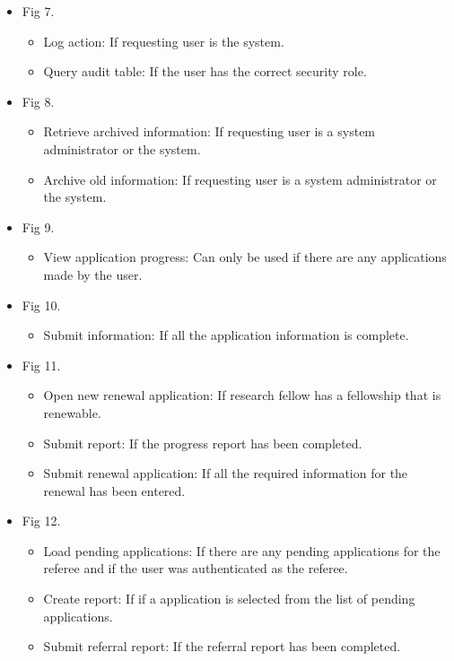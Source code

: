 \documentclass[12pt]{article}
\begin{document}
\begin{itemize}
	\item Fig 7.
		\begin{itemize}
			\item Log action: If requesting user is the system.
			\item Query audit table: If the user has the correct security role.										
		\end{itemize}
	\item Fig 8.
		\begin{itemize}
			\item Retrieve archived information: If requesting user is a system administrator or the system.
			\item Archive old information: If requesting user is a system administrator or the system.						
		\end{itemize}		
	\item Fig 9.
		\begin{itemize}
			\item View application progress: Can only be used if there are any applications made by the user.
		\end{itemize}
		
	\item Fig 10.
		\begin{itemize}
			\item Submit information: If all the application information is complete.
		\end{itemize}
	
	\item Fig 11.
		\begin{itemize}
			\item Open new renewal application: If research fellow has a fellowship that is renewable.
			\item Submit report: If the progress report has been completed.				
			\item Submit renewal application: If all the required information for the renewal has been entered.									
		\end{itemize}
	
	\item Fig 12.
		\begin{itemize}
			\item Load pending applications: If there are any pending applications for the referee and if the user was authenticated as the referee.
			\item Create report: If if a application is selected from the list of pending applications.				
			\item Submit referral report: If the referral report has been completed.									
		\end{itemize}
		

\end{itemize}
\end{document}
